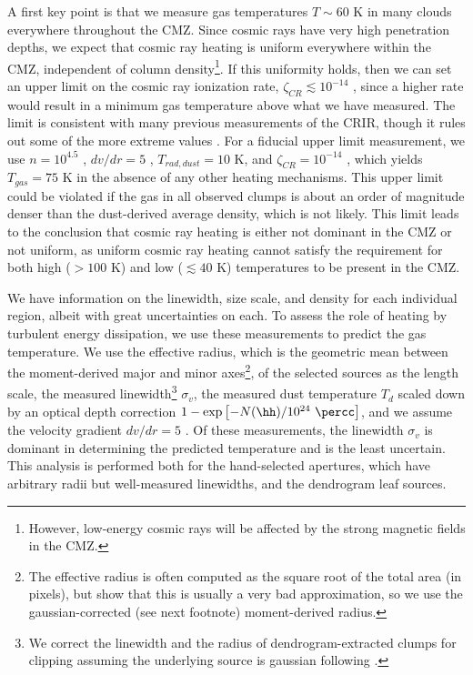 A first key point is that we measure gas temperatures $T\sim60$ K in many
clouds everywhere throughout the CMZ.  Since cosmic rays have very high
penetration depths, we expect that cosmic ray heating is uniform
everywhere within the CMZ, independent of column density\footnote{However,
low-energy cosmic rays will be affected by the strong magnetic fields in the
CMZ.}.  If this uniformity
holds, then we can set an upper limit on the cosmic ray ionization rate,
$\zeta_{CR} \lesssim 10^{-14}$ \pers, since a higher rate would result in a
minimum gas temperature above what we have measured.  The limit is consistent
with many previous measurements of the CRIR, though
it rules out some of the more extreme values \citep{Yusef-Zadeh2013b,Goto2013a}.
For a fiducial upper limit measurement, we use $n=10^{4.5}$ \percc, $dv/dr=5$
\kms \perpc, $T_{rad,dust}=10$ K, and $\zeta_{CR} = 10^{-14}$ \pers, which
yields $T_{gas}=75$ K in the absence of any other heating mechanisms.  This
upper limit could be violated if the gas in all observed clumps is about an
order of magnitude denser than the dust-derived average density, which is not
likely.  This limit leads to the conclusion that cosmic ray heating is either
not dominant in the CMZ or not uniform, as uniform cosmic ray heating cannot
satisfy the requirement for both high ($>100$ K) and low ($\lesssim40$ K)
temperatures to be present in the CMZ.



We have information on the linewidth, size scale, and density for each
individual region, albeit with great uncertainties on each. To assess the role
of heating by turbulent energy dissipation,  we use these measurements to
predict the gas temperature.  We use the effective radius,
which is the geometric mean between the moment-derived major and minor
axes\footnote{The effective radius is often computed as the square root of the
total area (in pixels), but \citet{Rosolowsky2006a} show that this is usually a
very bad approximation, so we use the gaussian-corrected (see next footnote)
moment-derived radius.}, of the selected sources as the length scale, the
measured linewidth\footnote{We correct the linewidth and the radius of
dendrogram-extracted clumps for clipping assuming the underlying source is
gaussian following \citet[][Appendix B]{Rosolowsky2005b}.}
$\sigma_v$, the
measured dust temperature $T_{d}$ scaled down by an optical depth correction
$1-\exp\left[-N(\hh)/10^{24}~\percc\right]$, and we assume the velocity gradient
$dv/dr = 5$ \kms \perpc.  Of these measurements, the linewidth $\sigma_v$ is
dominant in determining the predicted temperature and is the least uncertain.
This analysis is performed both for the hand-selected apertures, which have
arbitrary radii but well-measured linewidths, and the dendrogram leaf sources.

